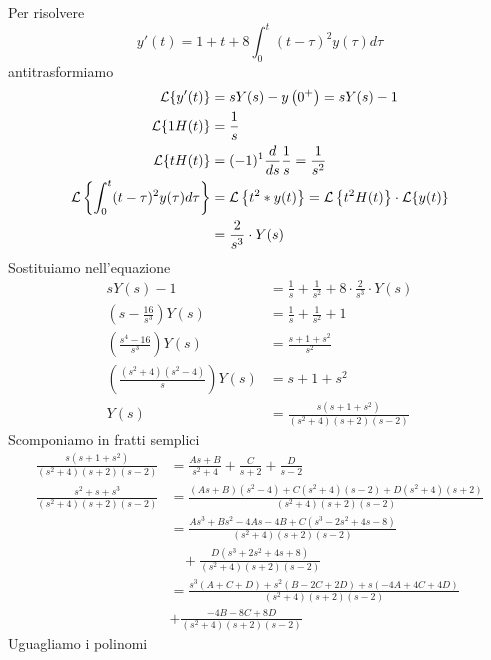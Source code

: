 Per risolvere
\begin{equation*}
y'(t) = 1 + t + 8\int^{t}_{0}(t - \tau)^{2} y(\tau) d\tau
\end{equation*}
antitrasformiamo
\begin{align*}
\mathcal{L}\{y'(t)\} & = sY(s) - y\left(0^{+}\right) = sY(s) - 1\\
\mathcal{L}\{1H(t)\} & = \frac{1}{s}\\
\mathcal{L}\{tH(t)\} & = (- 1)^{1}\frac{d}{ds}\frac{1}{s} = \frac{1}{s^{2}}\\
\mathcal{L}\left\{\int^{t}_{0}(t - \tau)^{2} y(\tau) d\tau \right\} & = \mathcal{L}\left\{t^{2} *y(t)\right\} = \mathcal{L}\left\{t^{2} H(t)\right\} \cdot \mathcal{L}\{y(t)\}\\
 & = \frac{2}{s^{3}} \cdot Y(s)
\end{align*}
Sostituiamo nell'equazione
\begin{align*}
sY(s) - 1 & = \frac{1}{s} + \frac{1}{s^{2}} + 8 \cdot \frac{2}{s^{3}} \cdot Y(s)\\
\left(s - \frac{16}{s^{3}}\right) Y(s) & = \frac{1}{s} + \frac{1}{s^{2}} + 1\\
\left(\frac{s^{4} - 16}{s^{3}}\right) Y(s) & = \frac{s + 1 + s^{2}}{s^{2}}\\
\left(\frac{\left(s^{2} + 4\right)\left(s^{2} - 4\right)}{s}\right) Y(s) & = s + 1 + s^{2}\\
Y(s) & = \frac{s\left(s + 1 + s^{2}\right)}{\left(s^{2} + 4\right)(s + 2)(s - 2)}
\end{align*}
Scomponiamo in fratti semplici
\begin{align*}
\frac{s\left(s + 1 + s^{2}\right)}{\left(s^{2} + 4\right)(s + 2)(s - 2)} & = \frac{As + B}{s^{2} + 4} + \frac{C}{s + 2} + \frac{D}{s - 2}\\
\frac{s^{2} + s + s^{3}}{\left(s^{2} + 4\right)(s + 2)(s - 2)} & = \frac{(As + B)\left(s^{2} - 4\right) + C\left(s^{2} + 4\right)(s - 2) + D\left(s^{2} + 4\right)(s + 2)}{\left(s^{2} + 4\right)(s + 2)(s - 2)}\\
 & = \frac{As^{3} + Bs^{2} - 4As - 4B + C\left(s^{3} - 2s^{2} + 4s - 8\right)}{\left(s^{2} + 4\right)(s + 2)(s - 2)}\\
 & \ \ \ \ + \frac{D\left(s^{3} + 2s^{2} + 4s + 8\right)}{\left(s^{2} + 4\right)(s + 2)(s - 2)}\\
 & = \frac{s^{3}(A + C + D) + s^{2}(B - 2C + 2D) + s(- 4A + 4C + 4D)}{\left(s^{2} + 4\right)(s + 2)(s - 2)}\\
 & + \frac{- 4B - 8C + 8D}{\left(s^{2} + 4\right)(s + 2)(s - 2)}
\end{align*}
Uguagliamo i polinomi
